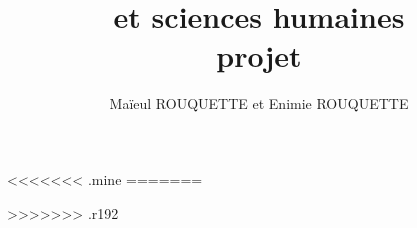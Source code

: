 \documentclass[a4paper,11pt]{book}
\begin{document}
\title{\XeLaTeX et sciences humaines \\ projet}
\author{Maïeul ROUQUETTE et Enimie ROUQUETTE}
\date{}

<<<<<<< .mine
%
%
%
%
%
%
%
%
%
%
%
%
%
%
=======

>>>>>>> .r192
%


\end{document}
